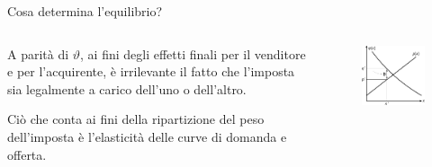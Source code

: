 \documentclass[aspectratio=64,12pt]{beamer}
\begin{document}
\begin{frame}{Cosa determina l'equilibrio?}
\begin{columns}
\begin{column}{.45\columnwidth}
A parità di $\vartheta$, ai fini degli effetti finali per il venditore e per
l'acquirente, è irrilevante il fatto che l'imposta sia legalmente a carico
dell'uno o dell'altro.
\smallskip

Ciò che conta ai fini della ripartizione del peso dell'imposta è l'elasticità
delle curve di domanda e offerta.
\end{column}

\begin{column}{.5\columnwidth}
\begin{figure}[htbp]
\centering
\includegraphics[width=\linewidth]{./figure/incidenza-4.pdf}
\end{figure}
\end{column}
\end{columns}
\end{frame}
\end{document}
